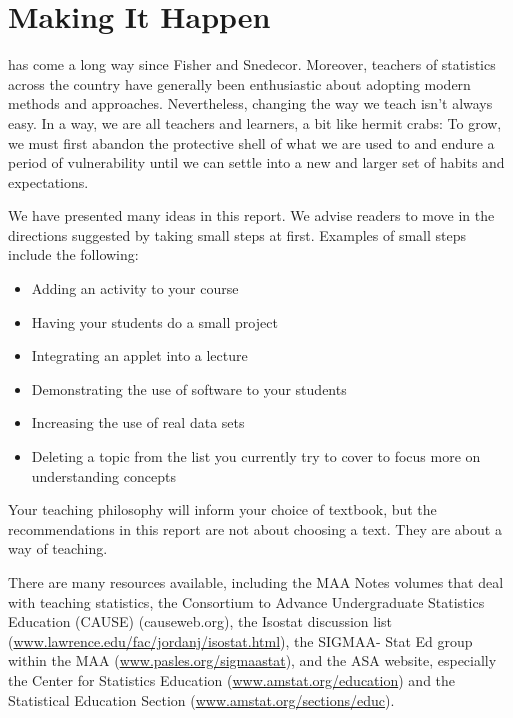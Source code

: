 \documentclass[twoside,openany]{tufte-book}
\begin{document}
\section{\textbf{Making It Happen}}
 
 has come a long way since Fisher and Snedecor. Moreover, teachers of statistics across the country have generally been enthusiastic about adopting modern methods and approaches. Nevertheless, changing the way we teach isn't always easy. In a way, we are all teachers and learners, a bit like hermit crabs:  To grow, we must first abandon the protective shell of what we are used to and endure a period of vulnerability until we can settle into a new and larger set of habits and expectations. 
 
We have presented many ideas in this report.  We advise readers to move in the directions suggested by taking small steps at first.  Examples of small steps include the following:

\renewcommand{\labelitemi}{$\filledsquare$}

\begin{itemize} [leftmargin=1cm, itemsep=.2em]
\item Adding an activity to your course
\item Having your students do a small project
\item Integrating an applet into a lecture
\item Demonstrating the use of software to your students
\item Increasing the use of real data sets
\item Deleting a topic from the list you currently try to cover to focus more on understanding concepts
\end{itemize}

Your teaching philosophy will inform your choice of textbook, but the recommendations in this report are not about choosing a text.  They are about a way of teaching. 
 
There are many resources available, including the MAA Notes volumes that deal with teaching statistics, the Consortium to Advance Undergraduate Statistics Education (CAUSE) (causeweb.org), the Isostat discussion list (\url{www.lawrence.edu/fac/jordanj/isostat.html}), the SIGMAA- Stat Ed group within the MAA (\url{www.pasles.org/sigmaastat}), and the ASA website, especially the Center for Statistics Education (\url{www.amstat.org/education}) and the Statistical Education Section (\url{www.amstat.org/sections/educ}).
 
\end{document}
